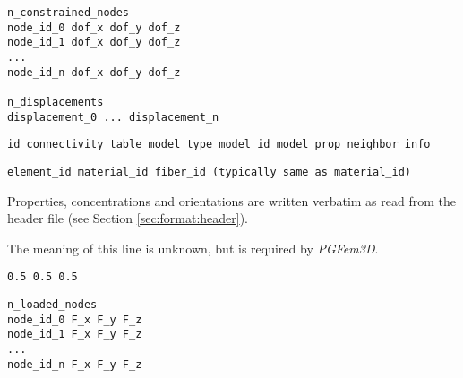 \documentclass[]{article}
\def\pgf{\emph{PGFem3D}}
\def\gap{\vspace*{5mm}}
\begin{document}
\gap
{}
\begin{center}
  \begin{minipage}{0.9\textwidth}
\begin{lstlisting}
n_constrained_nodes
node_id_0 dof_x dof_y dof_z
node_id_1 dof_x dof_y dof_z
...
node_id_n dof_x dof_y dof_z

n_displacements
displacement_0 ... displacement_n
\end{lstlisting}
  \end{minipage}
\end{center}

\gap
{}
\begin{center}
  \begin{minipage}{0.9\textwidth}
\begin{lstlisting}
id connectivity_table model_type model_id model_prop neighbor_info
\end{lstlisting}
  \end{minipage}
\end{center}

\gap
{}
\begin{center}
  \begin{minipage}{0.9\textwidth}
\begin{lstlisting}
element_id material_id fiber_id (typically same as material_id)
\end{lstlisting}
  \end{minipage}
\end{center}

\gap
{}
Properties, concentrations and orientations are written verbatim as
read from the header file (see Section \ref{sec:format:header}).

\gap
{}
The meaning of this line is unknown, but is required by \pgf{}.
\begin{center}
  \begin{minipage}{0.9\textwidth}
\begin{lstlisting}
0.5 0.5 0.5
\end{lstlisting}
  \end{minipage}
\end{center}

\gap
{}
\begin{center}
  \begin{minipage}{0.9\textwidth}
\begin{lstlisting}
n_loaded_nodes
node_id_0 F_x F_y F_z
node_id_1 F_x F_y F_z
...
node_id_n F_x F_y F_z
\end{lstlisting}
  \end{minipage}
\end{center}
\end{document}
